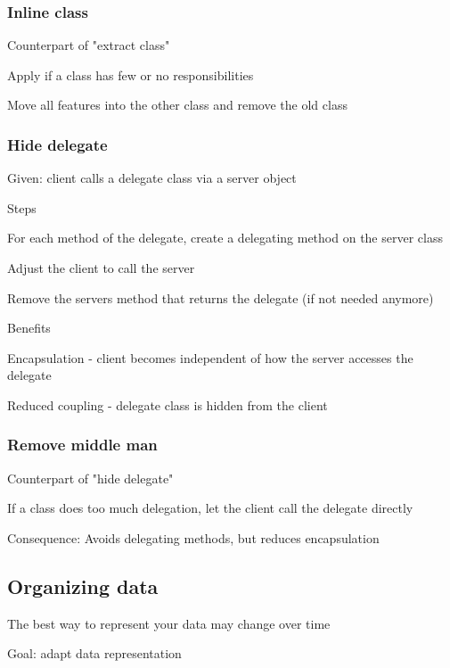 \documentclass[10pt]{article}
\begin{document}
\subsubsection{Inline class}
\enumstart
	\item Counterpart of "extract class"
	\item Apply if a class has few or no responsibilities
	\item Move all features into the other class and remove the old class
\enumend
	
\subsubsection{Hide delegate}
\enumstart
	\item Given: client calls a delegate class via a server object
	\item Steps
	\enumstart
		\item For each method of the delegate, create a delegating method on the server class
		\item Adjust the client to call the server
		\item Remove the servers method that returns the delegate (if not needed anymore)
	\enumend
	\item Benefits
	\enumstart
		\item Encapsulation - client becomes independent of how the server accesses the delegate
		\item Reduced coupling - delegate class is hidden from the client
	\enumend
\enumend

\subsubsection{Remove middle man}
\enumstart
	\item Counterpart of "hide delegate"
	\item If a class does too much delegation, let the client call the delegate directly
	\item Consequence: Avoids delegating methods, but reduces encapsulation
\enumend

\subsection{Organizing data}
\enumstart
	\item The best way to represent your data may change over time
	\item Goal: adapt data representation
\enumend
\end{document}
